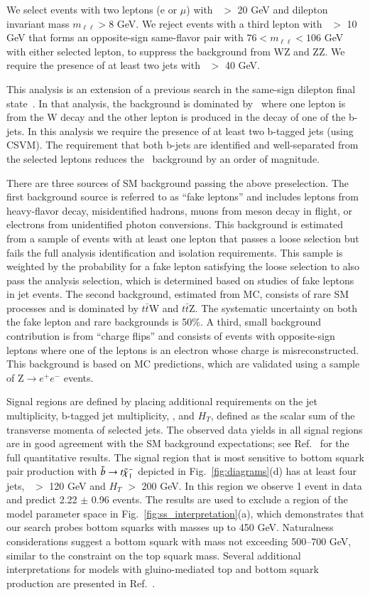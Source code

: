 We select events with two leptons (e or $\mu$) with \pt\ $>$ 20 GeV and dilepton invariant mass $m_{\ell\ell}>8$ GeV. 
We reject events with a third lepton with \pt\ $>$ 10 GeV that forms an opposite-sign
same-flavor pair with $76 < m_{\ell\ell} < 106$ GeV with either selected lepton, to suppress
the background from WZ and ZZ. We require the presence of at least two jets with \pt\ $>$ 40 GeV.

This analysis is an extension of a previous search in the same-sign dilepton final state~\cite{ref:ss_inclusive}.
In that analysis, the background is dominated by \ttljets\ where one lepton is from the W decay and the other
lepton is produced in the decay of one of the b-jets. In this analysis we require the presence of at least two
b-tagged jets (using CSVM). The requirement that both b-jets are identified and well-separated from the selected leptons
reduces the \ttljets\ background by an order of magnitude. 


There are three sources of SM background passing the above preselection. 
The first background source is referred to as ``fake leptons'' and includes leptons from heavy-flavor decay, 
misidentified hadrons, muons from meson decay in flight, or electrons from unidentified photon conversions. 
This background is estimated from a sample of events with at least one lepton that passes a loose selection 
but fails the full analysis identification and isolation requirements. This sample is weighted by the probability 
for a fake lepton satisfying the loose selection to also pass the analysis selection, which is determined based 
on studies of fake 
leptons in jet events. The second background, estimated from MC, consists of rare SM processes and is dominated 
by $t\bar{t}$W and $t\bar{t}$Z. The systematic uncertainty on both the fake lepton and rare backgrounds is 50\%. 
A third, small background contribution is from ``charge flips'' and consists of events with opposite-sign leptons 
where one of the leptons is an electron whose charge is misreconstructed. This background is based on MC predictions,
which are validated using a sample of Z$\to e^+e^-$ events.

Signal regions are defined by placing additional requirements on the jet multiplicity, b-tagged jet multiplicity, 
\met, and $H_T$, defined as the scalar sum of the transverse momenta of selected jets. 
The observed data yields in all signal regions are in good agreement with the SM background expectations;
see Ref.~\cite{ref:ss} for the full quantitative results. The signal region that is most sensitive to 
bottom squark pair production with $\tilde{b}\to t \tilde{\chi}_{1}^{-}$ depicted in Fig.~\ref{fig:diagrams}(d) 
has at least four jets, \met\ $>$ 120 GeV and
$H_T$ $>$ 200 GeV. In this region we observe 1 event in data and predict 2.22 $\pm$ 0.96 events.
The results are used to exclude a region of the model parameter space in Fig.~\ref{fig:ss_interpretation}(a),
which demonstrates that our search probes bottom squarks with masses up to 450 GeV.
Naturalness considerations suggest a bottom squark with mass not exceeding 500--700 GeV, similar to the constraint
on the top squark mass.
Several additional interpretations for models with gluino-mediated top and 
bottom squark production are presented in Ref.~\cite{ref:ss}.

